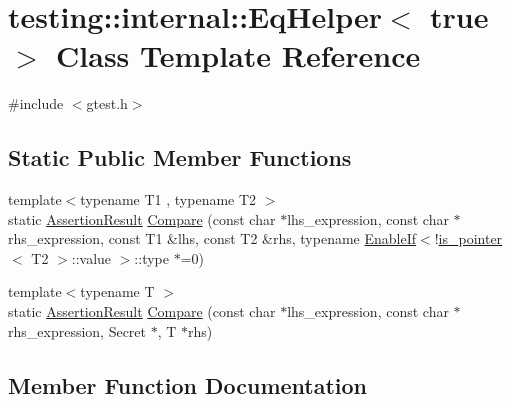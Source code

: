 \hypertarget{classtesting_1_1internal_1_1_eq_helper_3_01true_01_4}{}\section{testing\+::internal\+::Eq\+Helper$<$ true $>$ Class Template Reference}
\label{classtesting_1_1internal_1_1_eq_helper_3_01true_01_4}


{\ttfamily \#include $<$gtest.\+h$>$}

\subsection*{Static Public Member Functions}
\begin{DoxyCompactItemize}
\item 
{\footnotesize template$<$typename T1 , typename T2 $>$ }\\static \mbox{\hyperlink{classtesting_1_1_assertion_result}{Assertion\+Result}} \mbox{\hyperlink{classtesting_1_1internal_1_1_eq_helper_3_01true_01_4_a12c7194b2a210b61f06c912eef484ca6}{Compare}} (const char $\ast$lhs\+\_\+expression, const char $\ast$rhs\+\_\+expression, const T1 \&lhs, const T2 \&rhs, typename \mbox{\hyperlink{structtesting_1_1internal_1_1_enable_if}{Enable\+If}}$<$!\mbox{\hyperlink{structtesting_1_1internal_1_1is__pointer}{is\+\_\+pointer}}$<$ T2 $>$\+::value $>$\+::type $\ast$=0)
\item 
{\footnotesize template$<$typename T $>$ }\\static \mbox{\hyperlink{classtesting_1_1_assertion_result}{Assertion\+Result}} \mbox{\hyperlink{classtesting_1_1internal_1_1_eq_helper_3_01true_01_4_a6f292601a68c8f0d49e6d48bd309b900}{Compare}} (const char $\ast$lhs\+\_\+expression, const char $\ast$rhs\+\_\+expression, Secret $\ast$, T $\ast$rhs)
\end{DoxyCompactItemize}


\subsection{Member Function Documentation}
\mbox{\label{classtesting_1_1internal_1_1_eq_helper_3_01true_01_4_a12c7194b2a210b61f06c912eef484ca6}} 
